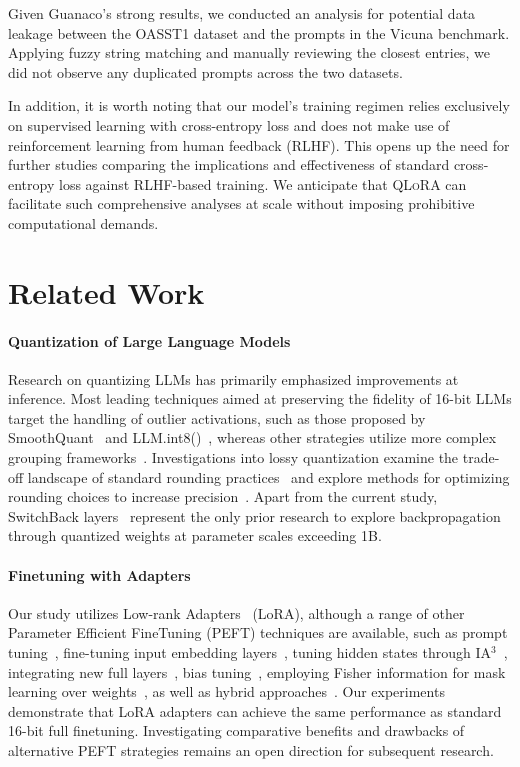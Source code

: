 Given {Guanaco}'s strong results, we conducted an analysis for potential data leakage between the OASST1 dataset and the prompts in the Vicuna benchmark. Applying fuzzy string matching and manually reviewing the closest entries, we did not observe any duplicated prompts across the two datasets.

In addition, it is worth noting that our model's training regimen relies exclusively on supervised learning with cross-entropy loss and does not make use of reinforcement learning from human feedback (RLHF). This opens up the need for further studies comparing the implications and effectiveness of standard cross-entropy loss against RLHF-based training. We anticipate that \textsc{QLoRA} can facilitate such comprehensive analyses at scale without imposing prohibitive computational demands.

\section{Related Work}

\paragraph{Quantization of Large Language Models} Research on quantizing LLMs has primarily emphasized improvements at inference. Most leading techniques aimed at preserving the fidelity of 16-bit LLMs target the handling of outlier activations, such as those proposed by SmoothQuant~\citep{xiao2022smoothquant} and LLM.int8()~\citep{dettmers2022llm}, whereas other strategies utilize more complex grouping frameworks~\citep{park2022nuqmm, yao2022zeroquant}. Investigations into lossy quantization examine the trade-off landscape of standard rounding practices~\citep{dettmers2022case,zeng2022glm,pope2022efficiently} and explore methods for optimizing rounding choices to increase precision~\citep{frantar2022gptq}. Apart from the current study, SwitchBack layers~\citep{wortsman2023stable} represent the only prior research to explore backpropagation through quantized weights at parameter scales exceeding 1B.

\paragraph{Finetuning with Adapters} Our study utilizes Low-rank Adapters~\citep{hu2021lora} (LoRA), although a range of other Parameter Efficient FineTuning (PEFT) techniques are available, such as prompt tuning~\citep{qin2021learning,lester2021power,li2021prefix}, fine-tuning input embedding layers~\citep{an2022input}, tuning hidden states through IA$^3$~\citep{liu2022few}, integrating new full layers~\citep{houlsby2019parameter}, bias tuning~\citep{zaken2021bitfit}, employing Fisher information for mask learning over weights~\citep{sung2021training}, as well as hybrid approaches~\citep{henderson2021compacter}. Our experiments demonstrate that LoRA adapters can achieve the same performance as standard 16-bit full finetuning. Investigating comparative benefits and drawbacks of alternative PEFT strategies remains an open direction for subsequent research.

